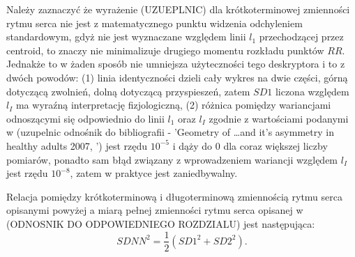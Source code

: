 Należy zaznaczyć że wyrażenie (UZUEPLNIC) dla krótkoterminowej zmienności rytmu serca
nie jest z matematycznego punktu widzenia odchyleniem standardowym, gdyż nie jest
wyznaczane względem linii $l_1$ przechodzącej przez centroid, to znaczy nie minimalizuje
drugiego momentu rozkładu punktów $RR$. Jednakże to w żaden sposób
nie umniejsza użyteczności tego deskryptora i to z dwóch powodów: (1) linia
identyczności dzieli cały wykres \PP{} na dwie części, górną dotyczącą zwolnień,
dolną dotyczącą przyspieszeń, zatem $SD1$ liczona względem $l_{I}$ ma wyraźną interpretację
fizjologiczną, (2) różnica pomiędzy wariancjami odnoszącymi się odpowiednio do linii $l_1$
oraz $l_{I}$ zgodnie z wartościami podanymi w 
(uzupelnic odnośnik do bibliografii - 'Geometry of \ldots  and it's asymmetry in healthy adults 2007, ')
jest rzędu $10^{-5}$ i dąży do $0$ dla coraz większej liczby pomiarów, ponadto sam błąd
związany z wprowadzeniem wariancji względem $l_{I}$ jest rzędu $10^{-8}$, zatem w praktyce
jest zaniedbywalny.

Relacja pomiędzy krótkoterminową i długoterminową zmiennością rytmu serca opisanymi powyżej
a miarą pełnej zmienności rytmu serca opisanej w (ODNOSNIK DO ODPOWIEDNIEGO ROZDZIALU)
jest następująca:
\begin{equation}
SDNN^2 = \frac{1}{2}(SD1^2 + SD2^2)\label{SDNNpartitioning}.
\end{equation}